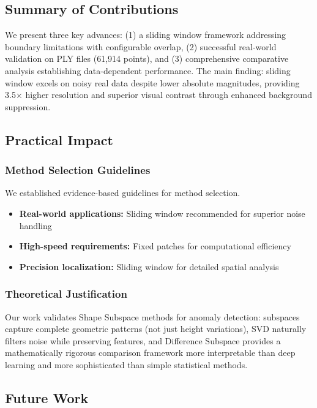 \documentclass[../main.tex]{subfiles}
\begin{document}
\subsection{Summary of Contributions}

We present three key advances: (1) a sliding window framework addressing boundary limitations with configurable overlap, (2) successful real-world validation on PLY files (61,914 points), and (3) comprehensive comparative analysis establishing data-dependent performance. The main finding: sliding window excels on noisy real data despite lower absolute magnitudes, providing 3.5× higher resolution and superior visual contrast through enhanced background suppression.

\subsection{Practical Impact}

\subsubsection{Method Selection Guidelines}

We established evidence-based guidelines for method selection.
\begin{itemize}
    \item \textbf{Real-world applications:} Sliding window recommended for superior noise handling
    \item \textbf{High-speed requirements:} Fixed patches for computational efficiency
    \item \textbf{Precision localization:} Sliding window for detailed spatial analysis
\end{itemize}

\subsubsection{Theoretical Justification}

Our work validates Shape Subspace methods for anomaly detection: subspaces capture complete geometric patterns (not just height variations), SVD naturally filters noise while preserving features, and Difference Subspace provides a mathematically rigorous comparison framework more interpretable than deep learning and more sophisticated than simple statistical methods.

\subsection{Future Work}
\end{document}
